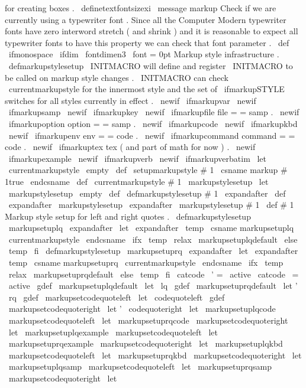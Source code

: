 {{for
creating
boxes
.
%
\
definetextfontsizexi
\
message
{
markup
}
%
Check
if
we
are
currently
using
a
typewriter
font
.
Since
all
the
%
Computer
Modern
typewriter
fonts
have
zero
interword
stretch
(
and
%
shrink
)
and
it
is
reasonable
to
expect
all
typewriter
fonts
to
have
%
this
property
we
can
check
that
font
parameter
.
%
\
def
\
ifmonospace
{
\
ifdim
\
fontdimen3
\
font
=
0pt
}
%
Markup
style
infrastructure
.
\
defmarkupstylesetup
\
INITMACRO
will
%
define
and
register
\
INITMACRO
to
be
called
on
markup
style
changes
.
%
\
INITMACRO
can
check
\
currentmarkupstyle
for
the
innermost
%
style
and
the
set
of
\
ifmarkupSTYLE
switches
for
all
styles
%
currently
in
effect
.
\
newif
\
ifmarkupvar
\
newif
\
ifmarkupsamp
\
newif
\
ifmarkupkey
%
\
newif
\
ifmarkupfile
%
file
=
=
samp
.
%
\
newif
\
ifmarkupoption
%
option
=
=
samp
.
\
newif
\
ifmarkupcode
\
newif
\
ifmarkupkbd
%
\
newif
\
ifmarkupenv
%
env
=
=
code
.
%
\
newif
\
ifmarkupcommand
%
command
=
=
code
.
\
newif
\
ifmarkuptex
%
tex
(
and
part
of
math
for
now
)
.
\
newif
\
ifmarkupexample
\
newif
\
ifmarkupverb
\
newif
\
ifmarkupverbatim
\
let
\
currentmarkupstyle
\
empty
\
def
\
setupmarkupstyle
#
1
{
%
\
csname
markup
#
1true
\
endcsname
\
def
\
currentmarkupstyle
{
#
1
}
%
\
markupstylesetup
}
\
let
\
markupstylesetup
\
empty
\
def
\
defmarkupstylesetup
#
1
{
%
\
expandafter
\
def
\
expandafter
\
markupstylesetup
\
expandafter
{
\
markupstylesetup
#
1
}
%
\
def
#
1
%
}
%
Markup
style
setup
for
left
and
right
quotes
.
\
defmarkupstylesetup
\
markupsetuplq
{
%
\
expandafter
\
let
\
expandafter
\
temp
\
csname
markupsetuplq
\
currentmarkupstyle
\
endcsname
\
ifx
\
temp
\
relax
\
markupsetuplqdefault
\
else
\
temp
\
fi
}
\
defmarkupstylesetup
\
markupsetuprq
{
%
\
expandafter
\
let
\
expandafter
\
temp
\
csname
markupsetuprq
\
currentmarkupstyle
\
endcsname
\
ifx
\
temp
\
relax
\
markupsetuprqdefault
\
else
\
temp
\
fi
}
{
\
catcode
\
'
=
\
active
\
catcode
\
=
\
active
\
gdef
\
markupsetuplqdefault
{
\
let
\
lq
}
\
gdef
\
markupsetuprqdefault
{
\
let
'
\
rq
}
\
gdef
\
markupsetcodequoteleft
{
\
let
\
codequoteleft
}
\
gdef
\
markupsetcodequoteright
{
\
let
'
\
codequoteright
}
}
\
let
\
markupsetuplqcode
\
markupsetcodequoteleft
\
let
\
markupsetuprqcode
\
markupsetcodequoteright
%
\
let
\
markupsetuplqexample
\
markupsetcodequoteleft
\
let
\
markupsetuprqexample
\
markupsetcodequoteright
%
\
let
\
markupsetuplqkbd
\
markupsetcodequoteleft
\
let
\
markupsetuprqkbd
\
markupsetcodequoteright
%
\
let
\
markupsetuplqsamp
\
markupsetcodequoteleft
\
let
\
markupsetuprqsamp
\
markupsetcodequoteright
%
\
let
\
}}
